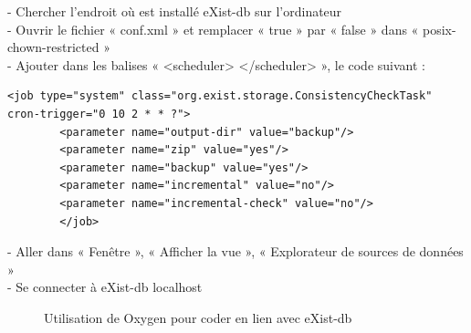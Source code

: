 \begin{flushleft}
	 - Chercher l'endroit où est installé eXist-db sur l'ordinateur \\
	 - Ouvrir le fichier « conf.xml » et remplacer « true » par « false » dans « posix-chown-restricted » \\
	 - Ajouter dans les balises « <scheduler> </scheduler> », le code suivant : \\
	 
\end{flushleft}

\begin{lstlisting}[breaklines=true]
	 	<job type="system" class="org.exist.storage.ConsistencyCheckTask"  cron-trigger="0 10 2 * * ?">
	 	<parameter name="output-dir" value="backup"/>
	 	<parameter name="zip" value="yes"/>
	 	<parameter name="backup" value="yes"/>
	 	<parameter name="incremental" value="no"/>
	 	<parameter name="incremental-check" value="no"/>
	 	</job>
\end{lstlisting}

\begin{flushleft}
	 - Aller dans « Fenêtre », « Afficher la vue », « Explorateur de sources de données » \\
	 - Se connecter à eXist-db localhost \\
\end{flushleft}

\begin{figure}[H]
	\centering
	\caption{Utilisation de Oxygen pour coder en lien avec eXist-db}
\end{figure}